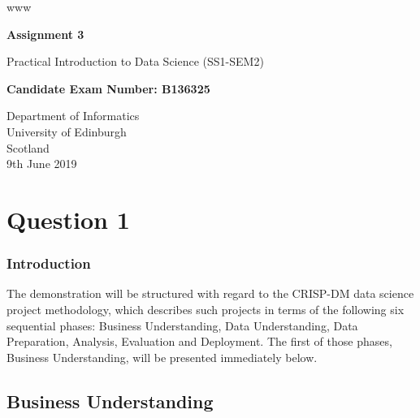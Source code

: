 www\documentclass[12pt, oneside, openany]{book}
\begin{document}
    \frontmatter

\begin{titlepage}
   \begin{center}
       \vspace*{1cm}
 
       \textbf{Assignment 3}
 
       \vspace{0.5cm}
        Practical Introduction to Data Science (SS1-SEM2)
 
       \vspace{1.5cm}
 
       \textbf{Candidate Exam Number: B136325}
 
       \vfill
 
       \vspace{0.8cm}
 
       Department of Informatics\\
       University of Edinburgh\\
       Scotland\\
       9th June 2019
 
   \end{center}
\end{titlepage}
    \pagestyle{plain}

    \tableofcontents

    \mainmatter

    \pagestyle{plain}

\setcounter{equation}{0}
\chapter*{Question 1}

\subsection*{Introduction}
The demonstration will be structured with regard to the CRISP-DM data science project methodology, which describes such projects in terms of the following six sequential phases: Business Understanding, Data Understanding, Data Preparation, Analysis, Evaluation and Deployment. The first of those phases, Business Understanding, will be presented immediately below.

\section*{Business Understanding}
\end{document}
